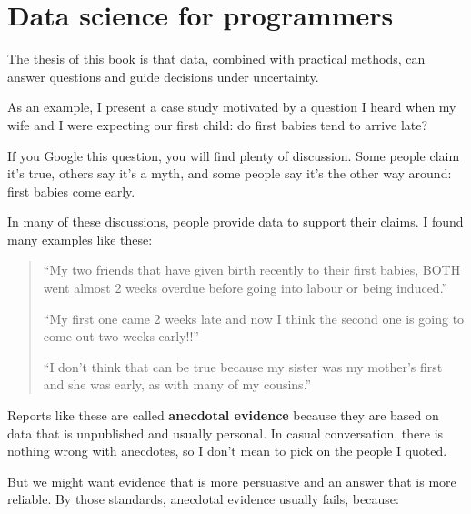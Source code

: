 \documentclass[12pt]{book}
\begin{document}
\normalsize

\clearemptydoublepage

\begin{latexonly}

\tableofcontents

\clearemptydoublepage

\end{latexonly}

\mainmatter


\chapter{Data science for programmers}
\label{intro}

The thesis of this book is that data, combined with practical
methods, can answer questions and guide decisions under uncertainty.

As an example, I present a case study motivated by a question
I heard when my wife and I were expecting our first child: do first
babies tend to arrive late?

If you Google this question, you will find plenty of
discussion.  Some people claim
it's true, others say it's a myth, and some people say it's the other
way around: first babies come early.

In many of these discussions, people provide data to support their
claims.  I found many examples like these:

\begin{quote}

``My two friends that have given birth recently to their first babies,
BOTH went almost 2 weeks overdue before going into labour or being
induced.''

``My first one came 2 weeks late and now I think the second one is
going to come out two weeks early!!''

``I don't think that can be true because my sister was my mother's
first and she was early, as with many of my cousins.''

\end{quote}

Reports like these are called {\bf anecdotal evidence} because they
are based on data that is unpublished and usually personal.  In casual
conversation, there is nothing wrong with anecdotes, so I don't mean
to pick on the people I quoted.

But we might want evidence that is more persuasive and
an answer that is more reliable.  By those standards, anecdotal
evidence usually fails, because:
\end{document}
